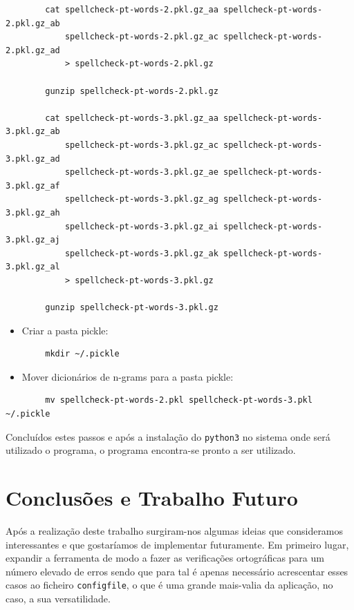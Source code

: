 \documentclass{article}
\begin{document}
\begin{verbatim}
        cat spellcheck-pt-words-2.pkl.gz_aa spellcheck-pt-words-2.pkl.gz_ab 
            spellcheck-pt-words-2.pkl.gz_ac spellcheck-pt-words-2.pkl.gz_ad 
            > spellcheck-pt-words-2.pkl.gz
        
        gunzip spellcheck-pt-words-2.pkl.gz
        
        cat spellcheck-pt-words-3.pkl.gz_aa spellcheck-pt-words-3.pkl.gz_ab 
            spellcheck-pt-words-3.pkl.gz_ac spellcheck-pt-words-3.pkl.gz_ad 
            spellcheck-pt-words-3.pkl.gz_ae spellcheck-pt-words-3.pkl.gz_af 
            spellcheck-pt-words-3.pkl.gz_ag spellcheck-pt-words-3.pkl.gz_ah 
            spellcheck-pt-words-3.pkl.gz_ai spellcheck-pt-words-3.pkl.gz_aj 
            spellcheck-pt-words-3.pkl.gz_ak spellcheck-pt-words-3.pkl.gz_al 
            > spellcheck-pt-words-3.pkl.gz
        
        gunzip spellcheck-pt-words-3.pkl.gz
\end{verbatim}


\begin{itemize}
    \item Criar a pasta pickle:
\end{itemize}

\begin{verbatim}
        mkdir ~/.pickle
\end{verbatim}

\begin{itemize}
    \item Mover dicionários de n-grams para a pasta pickle:
\end{itemize}

\begin{verbatim}
        mv spellcheck-pt-words-2.pkl spellcheck-pt-words-3.pkl ~/.pickle
\end{verbatim}


Concluídos estes passos e após a instalação do \texttt{python3} no sistema onde será utilizado o programa, o programa encontra-se pronto a ser utilizado.

\section{Conclusões e Trabalho Futuro}

Após a realização deste trabalho surgiram-nos algumas ideias que consideramos interessantes e que gostaríamos de implementar futuramente. Em primeiro lugar, expandir a ferramenta de modo a fazer as verificações ortográficas para um número elevado de erros sendo que para tal é apenas necessário acrescentar esses casos ao ficheiro \texttt{configfile}, o que é uma grande mais-valia da aplicação, no caso, a sua versatilidade.
\end{document}
